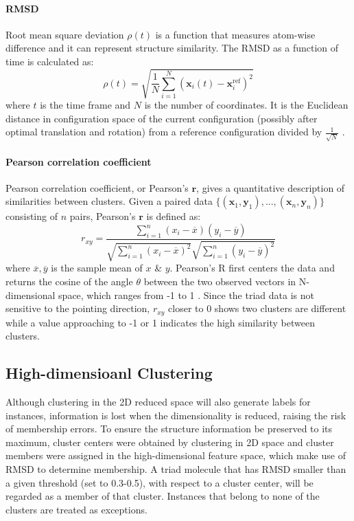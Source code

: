 \documentclass[a4paper]{article}
\begin{document}
\paragraph{RMSD}
Root mean square deviation \( \rho(t) \) is a function that measures atom-wise difference and it can represent structure similarity. The RMSD as a function of time is calculated as:
\begin{equation}
    \rho(t)=\sqrt{\frac{1}{N}\sum_{i=1}^N\left(\bm{x}_i(t)-\bm{x}_i^\text{ref}\right)^2}
    \label{Eq: RMSD}
\end{equation}
\noindent where \(t\) is the time frame and \(N\) is the number of coordinates. It is the Euclidean distance in configuration space of the current configuration (possibly after optimal translation and rotation) from a reference configuration divided by \(\frac{1}{\sqrt{N}}\) \cite{scikit-learn}.

\paragraph{Pearson correlation coefficient}
Pearson correlation coefficient, or Pearson's \( \bm{r}\), gives a quantitative description of similarities between clusters. Given a paired data \(\{(\bm{x}_1, \bm{y}_1), ..., (\bm{x}_n, \bm{y}_n)\}\) consisting of \(n\) pairs, Pearson's \( \bm{r}\) is defined as:
\begin{equation}
    r_{xy} = \frac{\sum_{i=1}^n(x_i-\overline{x})(y_i-\overline{y})}{\sqrt{\sum_{i=1}^n(x_i-\overline{x})^2}\sqrt{\sum_{i=1}^n(y_i-\overline{y})^2}}
    \label{Eq: Pearson R}
\end{equation}
\noindent where \(\overline{x}, \overline{y}\) is the sample mean of \(x\) \& \(y\). Pearson's R first centers the data and returns the cosine of the angle \(\theta\) between the two observed vectors in N-dimensional space, which ranges from -1 to 1 \cite{PearsonR}. Since the triad data is not sensitive to the pointing direction, \(r_{xy}\) closer to 0 shows two clusters are different while a value approaching to -1 or 1 indicates the high similarity between clusters. 

\subsection{High-dimensioanl Clustering}
Although clustering in the 2D reduced space will also generate labels for instances, information is lost when the dimensionality is reduced, raising the risk of membership errors. To ensure the structure information be preserved to its maximum, cluster centers were obtained by clustering in 2D space and cluster members were assigned in the high-dimensional feature space, which make use of RMSD to determine membership. A triad molecule that has RMSD smaller than a given threshold (set to 0.3-0.5), with respect to a cluster center, will be regarded as a member of that cluster. Instances that belong to none of the clusters are treated as exceptions. 
\end{document}
